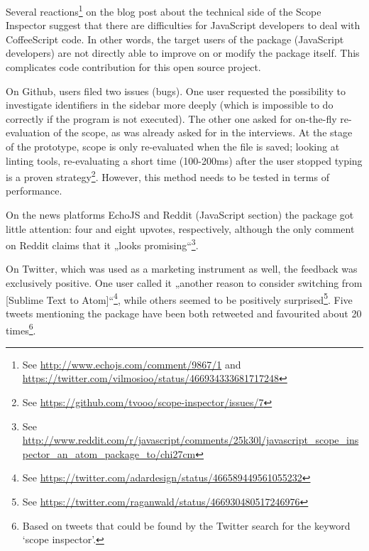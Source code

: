 Several
reactions\footnote{See \url{http://www.echojs.com/comment/9867/1} and\\\url{https://twitter.com/vilmosioo/status/466934333681717248}}
on the blog post about the technical side of the Scope Inspector
\cite{tvo} suggest that there are difficulties for JavaScript developers
to deal with CoffeeScript code. In other words, the target users of the
package (JavaScript developers) are not directly able to improve on or
modify the package itself. This complicates code contribution for this
open source project.

On Github, users filed two issues (bugs). One user requested the
possibility to investigate identifiers in the sidebar more deeply (which
is impossible to do correctly if the program is not executed). The other
one asked for on-the-fly re-evaluation of the scope, as was already
asked for in the interviews. At the stage of the prototype, scope is
only re-evaluated when the file is saved; looking at linting tools,
re-evaluating a short time (100-200ms) after the user stopped typing is
a proven
strategy\footnote{See \url{https://github.com/tvooo/scope-inspector/issues/7}}.
However, this method needs to be tested in terms of performance.

On the news platforms EchoJS and Reddit (JavaScript section) the package
got little attention: four and eight upvotes, respectively, although the
only comment on Reddit claims that it „looks
promising“\footnote{See \url{http://www.reddit.com/r/javascript/comments/25k30l/javascript_scope_inspector_an_atom_package_to/chi27cm}}.

On Twitter, which was used as a marketing instrument as well, the
feedback was exclusively positive. One user called it „another reason to
consider switching from {[}Sublime Text to
Atom{]}“\footnote{See \url{https://twitter.com/adardesign/status/466589449561055232}},
while others seemed to be positively
surprised\footnote{See \url{https://twitter.com/raganwald/status/466930480517246976}}.
Five tweets mentioning the package have been both retweeted and
favourited about 20
times\footnote{Based on tweets that could be found by the Twitter search for the keyword `scope inspector'.}.
